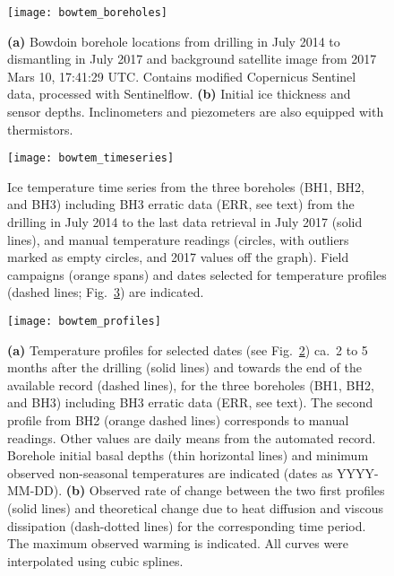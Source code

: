 \documentclass[utf8]{article}
\begin{document}
    \begin{figure}
      \centerline{\texttt{[image: bowtem\_boreholes]}}
      \caption{%
        \textbf{(a)} Bowdoin borehole locations from drilling in July 2014 to
          dismantling in July 2017 and background satellite image from 2017
          Mars 10, 17:41:29 UTC. Contains modified Copernicus Sentinel data,
          processed with Sentinelflow.
        \textbf{(b)} Initial ice thickness and sensor depths. Inclinometers
          and piezometers are also equipped with thermistors.}
      \label{fig:boreholes}
    \end{figure}

    \begin{figure}
      \centerline{\texttt{[image: bowtem\_timeseries]}}
      \caption{%
        Ice temperature time series from the three boreholes (BH1, BH2, and
        BH3) including BH3 erratic data (ERR, see text) from the drilling in
        July 2014 to the last data retrieval
        in July 2017 (solid lines), and manual temperature readings (circles,
        with outliers marked as empty circles, and 2017 values off the graph).
        Field campaigns (orange spans) and dates selected for
        temperature profiles (dashed lines; Fig.~\ref{fig:profiles}) are
        indicated.}
      \label{fig:timeseries}
    \end{figure}

    \begin{figure}
      \centerline{\texttt{[image: bowtem\_profiles]}}
      \caption{%
        \textbf{(a)} Temperature profiles for selected dates
          (see Fig.~\ref{fig:timeseries}) ca.~2 to 5 months after the drilling
          (solid lines) and towards the end of the available record (dashed
          lines), for the three boreholes (BH1, BH2, and BH3) including BH3
          erratic data (ERR, see text). The second profile from BH2 (orange
          dashed lines) corresponds to manual readings. Other values are daily
          means from the automated record. Borehole initial basal depths (thin
          horizontal lines) and minimum observed non-seasonal temperatures are
          indicated (dates as YYYY-MM-DD).
        \textbf{(b)} Observed rate of change between the two first profiles
          (solid lines) and theoretical change due to heat diffusion and
          viscous dissipation (dash-dotted lines) for the corresponding time
          period. The maximum observed warming is indicated. All curves were
          interpolated using cubic splines.}
      \label{fig:profiles}
    \end{figure}
\end{document}
